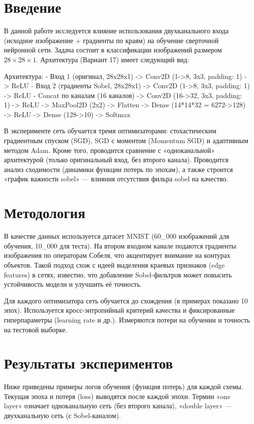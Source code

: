 \documentclass[14pt,a4paper]{extarticle}
\begin{document}
\section{Введение}

В данной работе исследуется влияние использования двухканального входа (исходное изображение + градиенты по краям) на обучение сверточной нейронной сети. Задача состоит в классификации изображений размером $28\times28\times1$. Архитектура (Вариант 17) имеет следующий вид:

   Архитектура:
   - Вход 1 (оригинал, 28x28x1) -> Conv2D (1->8, 3x3, padding: 1) -> ReLU
   - Вход 2 (градиенты Sobel, 28x28x1) -> Conv2D (1->8, 3x3, padding: 1) -> ReLU
   - Concat по каналам (16 каналов) -> Conv2D (16->32, 3x3, padding: 1) -> ReLU
   -> MaxPool2D (2x2) -> Flatten -> Dense (14*14*32 = 6272->128) -> ReLU ->
   Dense (128->10) -> Softmax

В эксперименте сеть обучается тремя оптимизаторами: стохастическим градиентным спуском (SGD), SGD с моментом (Momentum SGD) и адаптивным методом Adam. Кроме того, проводится сравнение с «одноканальной» архитектурой (только оригинальный вход, без второго канала). Проводится анализ сходимости (динамики функции потерь по эпохам), а также строится «график важности sobel» — влияния отсутствия фильра sobel на качество.

\section{Методология}

В качестве данных используется датасет MNIST (60\_000 изображений для обучения, 10\_000 для теста). На втором входном канале подаются градиенты изображения по операторам Собеля, что акцентирует внимание на контурах объектов. Такой подход схож с идеей выделения краевых признаков (edge features) в сетях; известно, что добавление Sobel-фильтров может повысить устойчивость модели и улучшить её точность.

Для каждого оптимизатора сеть обучается до схождения (в примерах показано 10 эпох). Используется кросс-энтропийный критерий качества и фиксированные гиперпараметры (learning rate и др.). Измеряются потери на обучении и точность на тестовой выборке.

\section{Результаты экспериментов}

Ниже приведены примеры логов обучения (функция потерь) для каждой схемы. Текущая эпоха и потеря (loss) выводятся после каждой эпохи. Термин «one layer» означает одноканальную сеть (без второго канала), «double layer» — двухканальную сеть (с Sobel-каналом).
\end{document}
